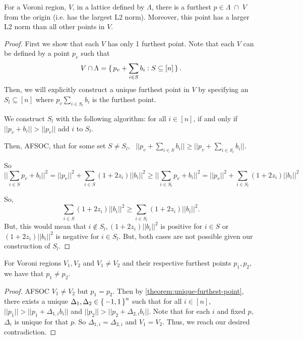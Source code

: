 \documentclass[12pt]{article}
\begin{document}
\begin{theorem}
	\label{theorem:unique-furthest-point}
	For a Voroni region, $V$, in a lattice defined by $\Lambda$, there is a furthest $p \in \Lambda \; \cap \; V$
	from the origin (i.e. has the largest L2 norm). Moreover, this point has a larger L2 norm than all other points in $V$.
	\begin{proof}
		First we show that each $V$ has only 1 furthest point. Note that each $V$ can be defined by a point $p_v$ 
		such that
		$$
			V \cap \Lambda = \set{p_v + \sum_{i \in S} b_i : S \subseteq [n]}.
		$$
		Then, we will explicitly construct a unique furthest point in $V$ by specifying an
		$S_l \subseteq [n]$ where $p_v \sum_{i \in S_l} b_i$ is the furthest point.

		We construct $S_l$ with the following algorithm: for all $i \in [n]$, if and only if $||p_v + b_i|| > ||p_v||$ add $i$ to $S_l$.
		
		Then, AFSOC, that for some set 
		$S \neq S_l$,    \
		$||p_v + \sum_{i \in S} b_i|| \geq ||p_v + \sum_{i \in S_l} b_i ||$.

		So
		$$
		||\sum_{i \in S} p_v + b_i||^2 = ||p_v||^2 + \sum_{i \in S} (1 + 2z_i)||b_i||^2 \geq
			||\sum_{i \in S_l} p_v + b_i||^2 = ||p_v||^2 + \sum_{i \in S_l} (1 + 2z_i)||b_i||^2 
		$$

		So, 
		$$
		\sum_{i \in S} (1 + 2z_i)||b_i||^2 \geq \sum_{i \in S_l} (1 + 2z_i)||b_i||^2.
		$$
		But, this would mean that
		$i \not \in S_l, (1 + 2z_i)||b_i||^2$ is positive for $i \in S$
		or 
		$(1 + 2z_i)||b_i||^2$ is negative for $i \in S_l$. But, both cases are not possible given
		our construction of $S_l$.
	
	\end{proof}
\end{theorem}

\begin{theorem}
	For Voroni regions $V_1, V_2$ and $V_1 \neq V_2$ and
	their respective furthest points $p_1, p_2$, we have that $p_1 \neq p_2$.

	\begin{proof}
		AFSOC $V_1 \neq V_2$ but $p_1 = p_2$. Then by \ref{theorem:unique-furthest-point}, there 
		exists a unique $\Delta_1, \Delta_2 \in \set{-1, 1}^n$
		such that for all $i \in [n]$,
		$||p_1|| > ||p_1 + \Delta_{1, i} b_i||$
		and $||p_2|| > ||p_2 + \Delta_{2, i} b_i||$.
		Note that for each $i$ and fixed $p$, $\Delta_i$ is unique for that $p$.
		So $\Delta_{1, i} = \Delta_{2, i}$ and $V_1 = V_2$. Thus, we reach our desired contradiction.
	\end{proof}
	
\end{theorem}
\end{document}
